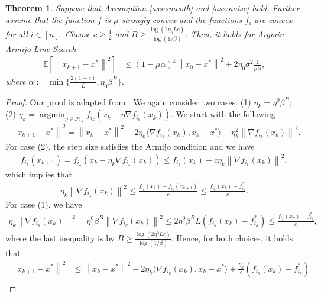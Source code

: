 \documentclass[10pt]{article} %
\newtheorem{theorem}{Theorem}
\newcommand{\EE}{\mathbb{E}}
\newcommand{\norm}[1]{\left \lVert #1 \right \rVert}
\DeclareMathOperator{\argmin}{argmin}
\begin{document}
\begin{theorem} Suppose that Assumption \ref{ass:smooth} and \ref{ass:noise} hold. Further assume that the function $f$ is $\mu$-strongly convex and the functions $f_i$ are convex for all $i \in [n]$. Choose $c \geq \frac{1}{2}$ and $B \geq \frac{\log(2 \eta_0 L c)}{\log(1/\beta)}$. Then, it holds for \textit{Argmin Armijo Line Search}
\begin{align*}
    \EE[\norm{x_{k+1}- x^*}^2] 
    &\leq (1 - \mu\alpha)^k \norm{x_{0}- x^*}^2 + 2 \eta_0 \sigma^2 \frac{1}{\mu \alpha}, 
\end{align*}
where $\alpha:=\min\{ \frac{2(1-c)}{L}, \eta_0 \beta^B\}$.     
\end{theorem}

\begin{proof}
    Our proof is adapted from \citet{loizou2021stochastic}. We again consider two cases: (1) $\eta_k = \eta^{0} \beta^B$; (2) $\eta_k = \argmin_{\eta \in \mathcal{H}_k} f_{i_k}(x_k - \eta \nabla f_{i_k}(x_k))$. We start with the following
    \begin{align*}
        \norm{x_{k+1} - x^*}^2 = \norm{x_k - x ^*}^2 - 2 \eta_k \langle \nabla {f_{i_k}} (x_k), x_k - x^* \rangle + \eta_k^2 \norm{\nabla f_{i_k} (x_k)}^2.
    \end{align*}
    For case (2), the step size satisfies the Armijo condition and we have
    \begin{align*}
        f_{i_k} (x_{k+1}) = f_{i_k} (x_k - \eta_k \nabla f_{i_k}(x_k)) \leq  f_{i_k} (x_k) - c \eta_k \norm{\nabla f_{i_k} (x_k)}^2,
    \end{align*}
    which implies that
    \begin{align*}
        \eta_k \norm{\nabla f_{i_k}(x_k)}^2 \leq \frac{f_{i_k} (x_k) - f_{i_k} (x_{k+1})}{c} \leq \frac{f_{i_k} (x_k) -f^*_{i_k}}{c}. 
    \end{align*}
    For case (1), we have 
    \begin{align*}
        \eta_k \norm{\nabla f_{i_k}(x_k)}^2 = \eta^0 \beta^B \norm{\nabla f_{i_k}(x_k)}^2 \leq 2 \eta^0 \beta^B L (f_{i_k} (x_k) -f^*_{i_k}) \leq \frac{f_{i_k} (x_k) -f^*_{i_k}}{c},
    \end{align*}
    where the last inequality is by $B \geq \frac{\log(2 \eta^0 L c)}{\log(1/\beta)}$. Hence, for both choices, it holds that
    \begin{align*}
        \norm{x_{k+1} - x^*}^2 &\leq  \norm{x_k - x ^*}^2 - 2 \eta_k \langle \nabla {f_{i_k}} (x_k), x_k - x^* \rangle + \frac{\eta_k}{c} (f_{i_k} (x_k) -f^*_{i_k}) \\

\end{align*}
\end{proof}
\end{document}
